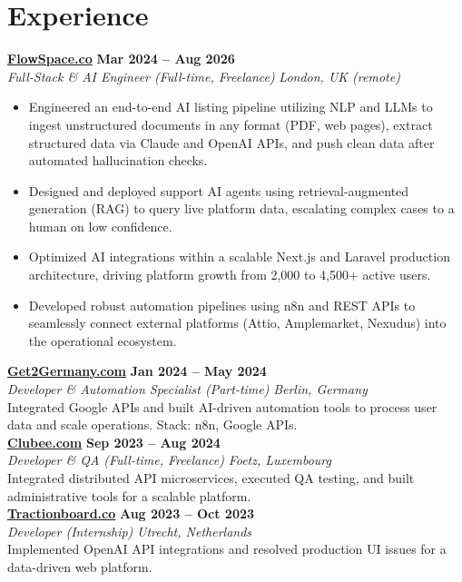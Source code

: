 \documentclass[a4paper,10pt]{article}
\newcommand{\role}[4]{%
 \textbf{#1} \hfill \textbf{#2}\\[1pt]%
 \textit{#3} \hfill \textit{#4}\\[2pt]%
}
\begin{document}
\section{Experience}

\role{\href{https://flowspace.co}{FlowSpace.co}}{Mar 2024 -- Aug 2026}{Full-Stack \& AI Engineer (Full-time, Freelance)}{London, UK (remote)}
\begin{itemize}
 \item Engineered an end-to-end AI listing pipeline utilizing NLP and LLMs to ingest unstructured documents in any format (PDF, web pages), extract structured data via Claude and OpenAI APIs, and push clean data after automated hallucination checks.
 \item Designed and deployed support AI agents using retrieval-augmented generation (RAG) to query live platform data, escalating complex cases to a human on low confidence.
 \item Optimized AI integrations within a scalable Next.js and Laravel production architecture, driving platform growth from 2,000 to 4,500+ active users.
 \item Developed robust automation pipelines using n8n and REST APIs to seamlessly connect external platforms (Attio, Amplemarket, Nexudus) into the operational ecosystem.
\end{itemize}

\role{\href{https://get2germany.com}{Get2Germany.com}}{Jan 2024 -- May 2024}{Developer \& Automation Specialist (Part-time)}{Berlin, Germany}
Integrated Google APIs and built AI-driven automation tools to process user data and scale operations. Stack: n8n, Google APIs.\\[1pt]

\role{\href{https://clubee.com}{Clubee.com}}{Sep 2023 -- Aug 2024}{Developer \& QA (Full-time, Freelance)}{Foetz, Luxembourg}
Integrated distributed API microservices, executed QA testing, and built administrative tools for a scalable platform.\\[1pt]

\role{\href{https://tractionboard.co}{Tractionboard.co}}{Aug 2023 -- Oct 2023}{Developer (Internship)}{Utrecht, Netherlands}
Implemented OpenAI API integrations and resolved production UI issues for a data-driven web platform.

\end{document}

